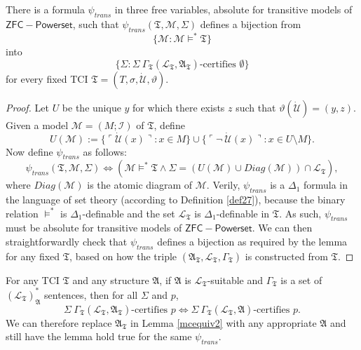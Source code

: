 \documentclass[12pt]{article}
\numberwithin{equation}{section}
\begin{document}
\begin{lem}\label{mcequiv2}
There is a formula $\psi_{trans}$ in three free variables, absolute for transitive models of $\mathsf{ZFC - Powerset}$, such that $\psi_{trans}(\mathfrak{T}, \mathcal{M}, \Sigma)$ defines a bijection from $$\{\mathcal{M} : \mathcal{M} \models^* \mathfrak{T}\}$$ into $$\{\Sigma : \Sigma \ \Gamma_{\mathfrak{T}} (\mathcal{L}_{\mathfrak{T}}, \mathfrak{A}_{\mathfrak{T}})\text{-certifies } \emptyset\}$$ for every fixed TCI $\mathfrak{T} = (T, \sigma, \dot{\mathcal{U}}, \vartheta)$.
\end{lem}

\begin{proof}
Let $U$ be the unique $y$ for which there exists $z$ such that $\vartheta(\dot{\mathcal{U}}) = (y, z)$. Given a model $\mathcal{M} = (M; \mathcal{I})$ of $\mathfrak{T}$, define $$U(\mathcal{M}) := \{\ulcorner \dot{\mathcal{U}}(x) \urcorner : x \in M\} \cup \{\ulcorner \neg \ \dot{\mathcal{U}}(x) \urcorner : x \in U \setminus M\}.$$ Now define $\psi_{trans}$ as follows: $$\psi_{trans}(\mathfrak{T}, \mathcal{M}, \Sigma) \iff (\mathcal{M} \models^* \mathfrak{T} \wedge \Sigma = (U(\mathcal{M}) \cup Diag(\mathcal{M})) \cap \mathcal{L}_{\mathfrak{T}}),$$ where $Diag(\mathcal{M})$ is the atomic diagram of $\mathcal{M}$. Verily, $\psi_{trans}$ is a $\Delta_1$ formula in the language of set theory (according to Definition \ref{def27}), because the binary relation $\models^*$ is $\Delta_1$-definable and the set $\mathcal{L}_{\mathfrak{T}}$ is $\Delta_1$-definable in $\mathfrak{T}$. As such, $\psi_{trans}$ must be absolute for transitive models of $\mathsf{ZFC - Powerset}$. We can then straightforwardly check that $\psi_{trans}$ defines a bijection as required by the lemma for any fixed $\mathfrak{T}$, based on how the triple $(\mathfrak{A}_{\mathfrak{T}}, \mathcal{L}_{\mathfrak{T}}, \Gamma_{\mathfrak{T}})$ is constructed from $\mathfrak{T}$. 
\end{proof}

\begin{rem}\label{swapA}
For any TCI $\mathfrak{T}$ and any structure $\mathfrak{A}$, if $\mathfrak{A}$ is $\mathcal{L}_{\mathfrak{T}}$-suitable and $\Gamma_{\mathfrak{T}}$ is a set of $(\mathcal{L}_{\mathfrak{T}})^*_{\mathfrak{A}}$ sentences, then for all $\Sigma$ and $p$, $$\Sigma \ \Gamma_{\mathfrak{T}} (\mathcal{L}_{\mathfrak{T}}, \mathfrak{A}_{\mathfrak{T}})\text{-certifies } p \iff \Sigma \ \Gamma_{\mathfrak{T}} (\mathcal{L}_{\mathfrak{T}}, \mathfrak{A})\text{-certifies } p.$$ We can therefore replace $\mathfrak{A}_{\mathfrak{T}}$ in Lemma \ref{mcequiv2} with any appropriate $\mathfrak{A}$ and still have the lemma hold true for the same $\psi_{trans}$.
\end{rem}
\end{document}
